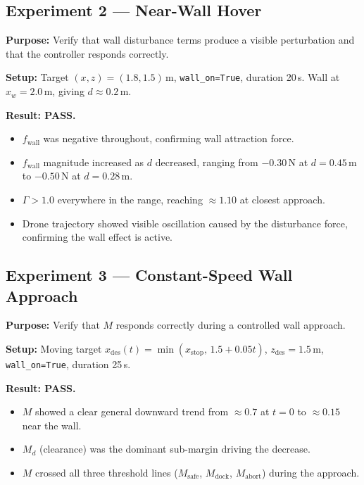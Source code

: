 \documentclass[12pt]{article}
\begin{document}
\subsection{Experiment 2 --- Near-Wall Hover}

\textbf{Purpose:} Verify that wall disturbance terms produce a visible
perturbation and that the controller responds correctly.

\textbf{Setup:} Target $(x, z) = (1.8, 1.5)$\,m, \texttt{wall\_on=True},
duration 20\,s. Wall at $x_w = 2.0$\,m, giving $d \approx 0.2$\,m.

\textbf{Result: PASS.}
\begin{itemize}
    \item $f_\mathrm{wall}$ was negative throughout, confirming wall
          attraction force.
    \item $f_\mathrm{wall}$ magnitude increased as $d$ decreased, ranging
          from $-0.30$\,N at $d = 0.45$\,m to $-0.50$\,N at $d = 0.28$\,m.
    \item $\Gamma > 1.0$ everywhere in the range, reaching $\approx 1.10$
          at closest approach.
    \item Drone trajectory showed visible oscillation caused by the
          disturbance force, confirming the wall effect is active.
\end{itemize}

\subsection{Experiment 3 --- Constant-Speed Wall Approach}

\textbf{Purpose:} Verify that $M$ responds correctly during a controlled
wall approach.

\textbf{Setup:} Moving target $x_\mathrm{des}(t) = \min(x_\mathrm{stop},\,
1.5 + 0.05t)$, $z_\mathrm{des} = 1.5$\,m, \texttt{wall\_on=True},
duration 25\,s.

\textbf{Result: PASS.}
\begin{itemize}
    \item $M$ showed a clear general downward trend from $\approx 0.7$
          at $t = 0$ to $\approx 0.15$ near the wall.
    \item $M_d$ (clearance) was the dominant sub-margin driving the decrease.
    \item $M$ crossed all three threshold lines ($M_\mathrm{safe}$,
          $M_\mathrm{dock}$, $M_\mathrm{abort}$) during the approach.
\end{itemize}
\end{document}
